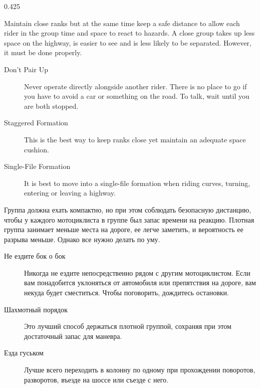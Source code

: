 

\begin{langblock}{0.425}
	\begin{eng}
	
	
	Maintain close ranks but at the same time keep a safe distance to allow each rider in the group time and space to react to hazards. A close group takes up less space on the highway, is easier to see and is less likely to be separated. However, it must be done properly.
	
	
	\begin{description}
		\item[Don't Pair Up] Never operate directly alongside another rider. There is no place to go if you have to avoid a car or something on the road. To talk, wait until you are both stopped.
		\item[Staggered Formation] This is the best way to keep ranks close yet maintain an adequate space cushion.
		\item[Single-File Formation] It is best to move into a single-file formation when riding curves, turning, entering or leaving a highway.
	\end{description}
	\end{eng}
	\begin{rus}
		
		
		Группа должна ехать компактно, но при этом соблюдать безопасную дистанцию, чтобы у каждого мотоциклиста в группе был запас времени на реакцию. Плотная группа занимает меньше места на дороге, ее легче заметить, и вероятность ее разрыва меньше. Однако все нужно делать по уму.
		
		
		\begin{description}
			\item[Не ездите бок о бок] Никогда не ездите непосредственно рядом с другим мотоциклистом. Если вам понадобится уклоняться от автомобиля или препятствия на дороге, вам некуда будет сместиться. Чтобы поговорить, дождитесь остановки.
			\item[Шахмотный порядок] Это лучший способ держаться плотной группой, сохраняя при этом достаточный запас для маневра.
			\item[Езда гуськом] Лучше всего переходить в колонну по одному при прохождении поворотов, разворотов, въезде на шоссе или съезде с него.
		\end{description}
\end{rus}
\end{langblock}
	
